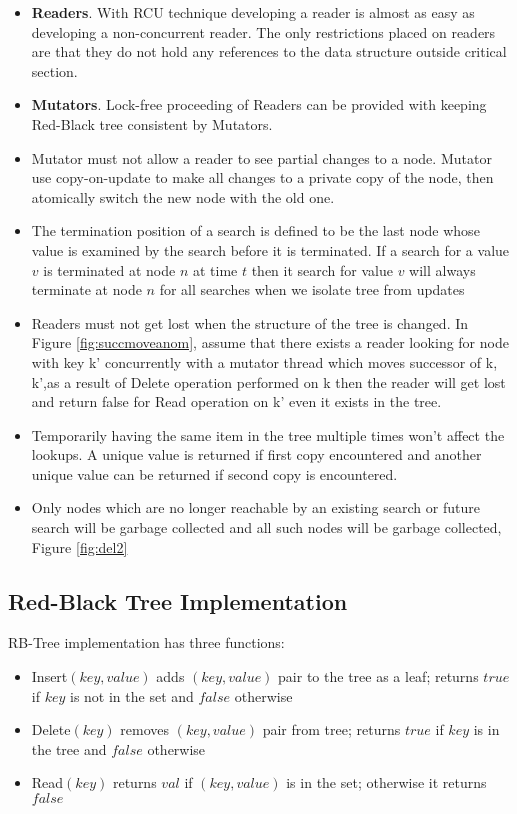 \begin{itemize} 
\item \textsf{\textbf{Readers}}. With RCU technique developing a reader is almost as easy as developing a non-concurrent reader.  The only restrictions placed on readers are that they do not hold any references to the data structure outside critical section.
\item \textsf{\textbf{Mutators}}. Lock-free proceeding of \textsf{Readers} can be provided with keeping Red-Black tree consistent by \textsf{Mutators}. 
\item Mutator must not allow a reader to see partial changes to a node. Mutator use copy-on-update to make all changes to a private copy of the node, then atomically switch the new node with the old one.
\item The termination position of a search is defined to be the last node whose value is examined by the search before it is terminated. If a search for a value $v$ is terminated at node $n$ at  time $t$ then it search for value $v$ will always terminate at node $n$ for all searches when we isolate tree from updates
\item Readers must not get lost when the structure of the tree is changed. In Figure \ref{fig:succmoveanom}, assume that there exists a reader looking for node with key \textsf{k'} concurrently with a mutator thread which moves successor of \textsf{k}, \textsf{k'},as a result of \textsf{Delete} operation performed on \textsf{k}  then the reader will get lost and return false for \textsf{Read} operation on \textsf{k'} even it exists in the tree.
\item  Temporarily having the same item in the tree multiple times won't affect the lookups. A unique value is returned if first copy encountered and another unique value can be returned if second copy is encountered.
\item Only nodes which are  no longer reachable  by an existing search or  future search will be garbage collected and all such nodes will be garbage collected, Figure \ref{fig:del2}
\end{itemize}
\subsection{Red-Black Tree Implementation}
RB-Tree implementation has three functions:
\begin{itemize}
\item \textsf{Insert}$(key,value)$ adds $(key,value)$ pair to the tree as a leaf; returns $true$ if $key$ is not in the set and $false$ otherwise
\item \textsf{Delete}$(key)$ removes $(key,value)$ pair  from tree; returns $true$ if $key$ is in the tree and $false$ otherwise
\item \textsf{Read}$(key)$ returns $val$ if $(key,value)$ is in the set; otherwise it returns $false$
\end{itemize}

